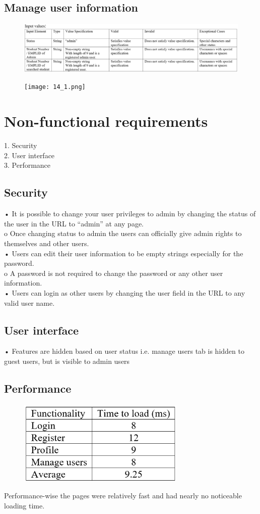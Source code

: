 \documentclass{article}
\begin{document}
\subsection{Manage user information}
\begin{figure}[ht!]
\hspace*{-2.5cm} 
\includegraphics[width=180mm]{13.png}
\end{figure}

\begin{figure}[ht!]
\hspace*{-2.5cm} 
\texttt{[image: 14\_1.png]}
\end{figure}

\section{Non-functional requirements}
1.	Security\\
2.	User interface\\
3.	Performance\\

\subsection{Security}
•	It is possible to change your user privileges to admin by changing the status of the user in the URL to “admin” at any page.\\
o	Once changing status to admin the users can officially give admin rights to themselves and other users.\\
•	Users can edit their user information to be empty strings especially for the password.\\
o	A password is not required to change the password or any other user information.\\
•	Users can login as other users by changing the user field in the URL to any valid user name.\\


\subsection{User interface}
•	Features are hidden based on user status i.e. manage users tab is hidden to guest users, but is visible to admin users\\

\subsection{Performance}
\begin{figure}[ht!]
\hspace*{-2.5cm} 
\includegraphics[width=80mm]{15.png}
\end{figure}
Performance-wise the pages were relatively fast and had nearly no noticeable loading time.
\end{document}
